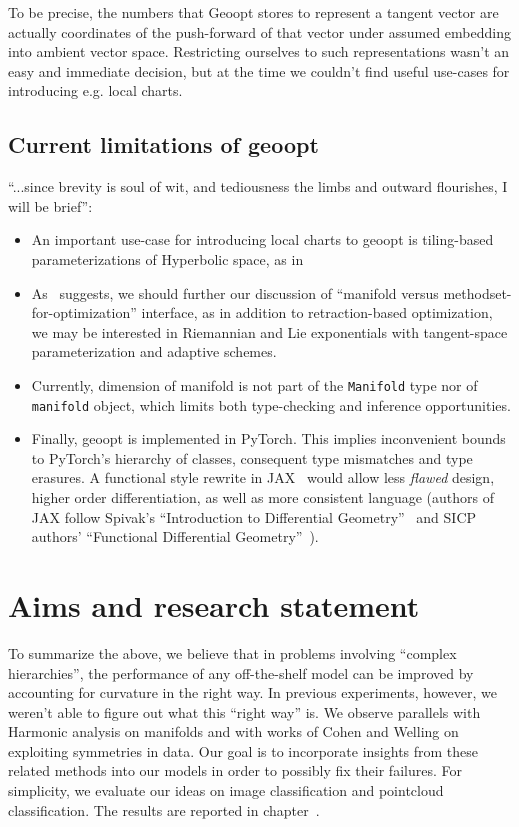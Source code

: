 To be precise, the numbers that Geoopt stores to
represent a tangent vector are actually coordinates of the push-forward of that
vector under assumed embedding into ambient vector space. Restricting ourselves
to such representations wasn't an easy and immediate decision, but at the time
we couldn't find useful use-cases for introducing e.g. local charts.

\subsection{Current limitations of geoopt} \label{sec:geooptTodo}

``...since brevity is soul of wit, and tediousness the limbs and outward
flourishes, I will be brief'':
\begin{itemize}
\item An important use-case for introducing local charts to geoopt is tiling-based
parameterizations of Hyperbolic space, as in~\citet{yaSaTilingBased}
\item As~\citet{trivializations} suggests, we should further our discussion of
``manifold versus methodset-for-optimization'' interface, as in addition to
retraction-based optimization, we may be interested in Riemannian and Lie
exponentials with tangent-space parameterization and adaptive schemes.
\item Currently, dimension of manifold is not part of the \texttt{Manifold}
type nor of \texttt{manifold} object, which limits both type-checking and
inference opportunities.
\item Finally, geoopt is implemented in PyTorch. This implies inconvenient
    bounds to PyTorch's hierarchy of classes, consequent type mismatches and
        type erasures.  A functional style rewrite in JAX~\cite{jax2018github} would allow less
        \emph{flawed} design, higher order differentiation, as well as more
        consistent language (authors of JAX follow Spivak's ``Introduction to
        Differential Geometry''~\cite{spivak1970comprehensive} and
        SICP~\cite{abelson1996structure} authors' ``Functional Differential
        Geometry''~\cite{sussman2013functional}).
\end{itemize}

\section{Aims and research statement} \label{sec:statement}

To summarize the above, we believe that in problems involving ``complex
hierarchies'', the performance of any off-the-shelf model can be improved by
accounting for curvature in the right way. In previous experiments, however, we
weren't able to figure out what this ``right way'' is. We observe parallels
with Harmonic analysis on manifolds and with works of Cohen and Welling on
exploiting symmetries in data. Our goal is to incorporate insights from these
related methods into our models in order to possibly fix their failures.
For simplicity, we evaluate our ideas on image classification and pointcloud
classification.  The results are reported in chapter~.
